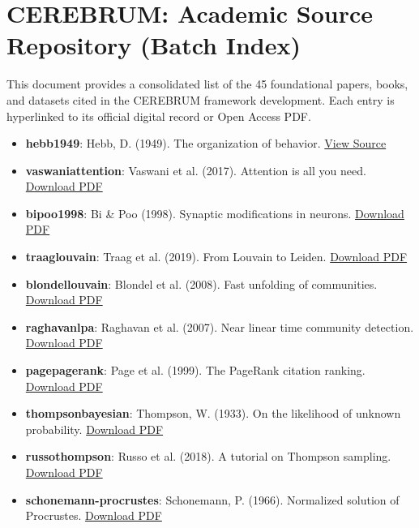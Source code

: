 \section{CEREBRUM: Academic Source Repository (Batch Index)}

This document provides a conso\-lidated list of the 45 found\-ational papers, books, and datasets cited in the CEREBRUM framework development. Each entry is hyperlinked to its official digital record or Open Access PDF.

\begin{itemize}
\item \textbf{hebb1949}: Hebb, D. (1949). The organ\-ization of behavior. \href{https://archive.org/details/organizationofbe00hebb}{View Source}
\item \textbf{vaswani\-attention}: Vaswani et al. (2017). Attention is all you need. \href{https://arxiv.org/pdf/1706.03762.pdf}{Download PDF}
\item \textbf{bipoo1998}: Bi \& Poo (1998). Synaptic modif\-ications in neurons. \href{https://www.jneurosci.org/content/jneuro/18/24/10464.full.pdf}{Download PDF}
\item \textbf{traag\-louvain}: Traag et al. (2019). From Louvain to Leiden. \href{https://arxiv.org/pdf/1810.08473.pdf}{Download PDF}
\item \textbf{blondel\-louvain}: Blondel et al. (2008). Fast unfolding of communities. \href{https://arxiv.org/pdf/0803.0476.pdf}{Download PDF}
\item \textbf{raghavan\-lpa}: Raghavan et al. (2007). Near linear time community detection. \href{https://arxiv.org/pdf/0709.2931.pdf}{Download PDF}
\item \textbf{page\-pagerank}: Page et al. (1999). The PageRank citation ranking. \href{http://ilpubs.stanford.edu:8090/422/1/1999-66.pdf}{Download PDF}
\item \textbf{thompson\-bayesian}: Thompson, W. (1933). On the likelihood of unknown probability. \href{https://www.gwern.net/docs/statistics/bayes/1933-thompson.pdf}{Download PDF}
\item \textbf{russo\-thompson}: Russo et al. (2018). A tutorial on Thompson sampling. \href{https://web.stanford.edu/~bvr/pubs/TS_Tutorial.pdf}{Download PDF}
\item \textbf{schon\-emann\--procrustes}: Schonemann, P. (1966). Normalized solution of Procrustes. \href{https://psychometrika.org/index.php/psychometrika/article/download/10.1007/BF02289451/1056}{Download PDF}

\end{itemize}
